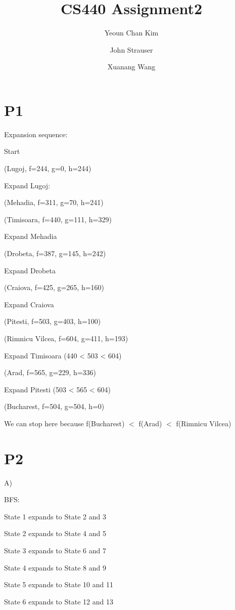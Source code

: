 \documentclass{article}
\author{Yeoun Chan Kim \and John Strauser \and Xuanang Wang}
\title{CS440 Assignment2}
\begin{document}
\maketitle

\section*{P1}

\hspace{5mm}

Expansion sequence:

Start

(Lugoj, f=244, g=0, h=244)

Expand Lugoj:

(Mehadia, f=311, g=70, h=241)

(Timisoara, f=440, g=111, h=329)

Expand Mehadia

(Drobeta, f=387, g=145, h=242)

Expand Drobeta

(Craiova, f=425, g=265, h=160)

Expand Craiova

(Pitesti, f=503, g=403, h=100)

(Rimnicu Vilcea, f=604, g=411, h=193)

Expand Timisoara (440 < 503 < 604)

(Arad, f=565, g=229, h=336)

Expand Pitesti (503 < 565 < 604)

(Bucharest, f=504, g=504, h=0) 

We can stop here because f(Bucharest) $<$ f(Arad) $<$ f(Rimnicu Vilcea)

\section*{P2}

\hspace{5mm}

A)

BFS:

State 1 expands to State 2 and 3

State 2 expands to State 4 and 5

State 3 expands to State 6 and 7

State 4 expands to State 8 and 9

State 5 expands to State 10 and 11

State 6 expands to State 12 and 13
\end{document}
